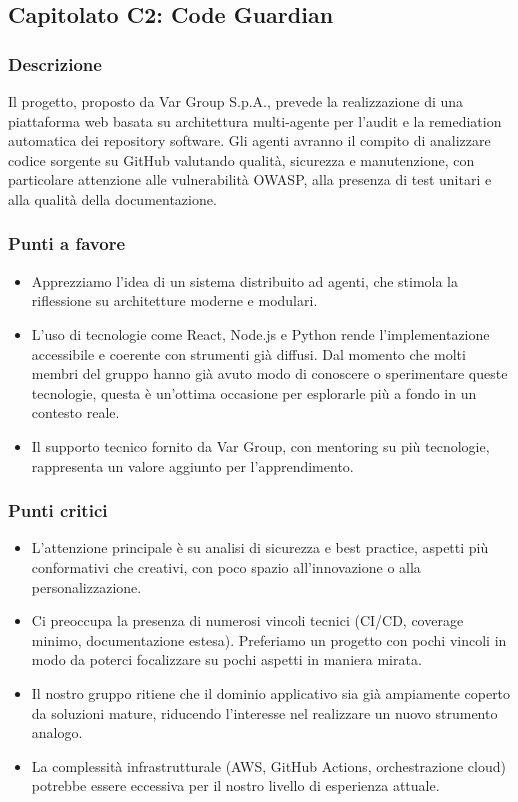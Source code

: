 \documentclass[a4paper,12pt]{article}
\begin{document}
\subsection{Capitolato C2: Code Guardian}

\subsubsection{Descrizione}
Il progetto, proposto da Var Group S.p.A., prevede la realizzazione di una piattaforma web basata su architettura multi-agente per l’audit e la remediation automatica dei repository software. Gli agenti avranno il compito di analizzare codice sorgente su GitHub valutando qualità, sicurezza e manutenzione, con particolare attenzione alle vulnerabilità OWASP, alla presenza di test unitari e alla qualità della documentazione.

\subsubsection{Punti a favore}
\begin{itemize}
    \item Apprezziamo l’idea di un sistema distribuito ad agenti, che stimola la riflessione su architetture moderne e modulari.
    \item L’uso di tecnologie come React, Node.js e Python rende l’implementazione accessibile e coerente con strumenti già diffusi. Dal momento che molti membri del gruppo hanno già avuto modo di conoscere o sperimentare queste tecnologie, questa è un’ottima occasione per esplorarle più a fondo in un contesto reale.
    \item Il supporto tecnico fornito da Var Group, con mentoring su più tecnologie, rappresenta un valore aggiunto per l’apprendimento.
\end{itemize}

\subsubsection{Punti critici}
\begin{itemize}
    \item L’attenzione principale è su analisi di sicurezza e best practice, aspetti più conformativi che creativi, con poco spazio all’innovazione o alla personalizzazione.
    \item Ci preoccupa la presenza di numerosi vincoli tecnici (CI/CD, coverage minimo, documentazione estesa). Preferiamo un progetto con pochi vincoli in modo da poterci focalizzare su pochi aspetti in maniera mirata.
    \item Il nostro gruppo ritiene che il dominio applicativo sia già ampiamente coperto da soluzioni mature, riducendo l’interesse nel realizzare un nuovo strumento analogo.
    \item La complessità infrastrutturale (AWS, GitHub Actions, orchestrazione cloud) potrebbe essere eccessiva per il nostro livello di esperienza attuale.
\end{itemize}
\end{document}
